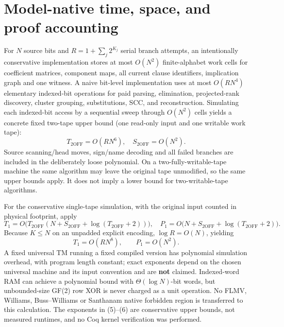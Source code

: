 \documentclass[11pt]{article}
\begin{document}
\section{Model-native time, space, and proof accounting}
For $N$ source bits and $R=1+\sum_j2^{K_j}$ serial branch attempts, an intentionally conservative implementation stores at most $O(N^2)$ finite-alphabet work cells for coefficient matrices, component maps, all current clause identifiers, implication graph and one witness. A naive bit-level implementation uses at most $O(R N^4)$ elementary indexed-bit operations for paid parsing, elimination, projected-rank discovery, cluster grouping, substitutions, SCC, and reconstruction. Simulating each indexed-bit access by a sequential sweep through $O(N^2)$ cells yields a concrete fixed two-tape upper bound (one read-only input and one writable work tape):
\[
 \boxed{T_{2\mathrm{OFF}}=O(RN^6),\quad S_{2\mathrm{OFF}}=O(N^2).} \tag{5}
\]
Source scanning/head moves, sign/name decoding and all failed branches are included in the deliberately loose polynomial. On a two-fully-writable-tape machine the same algorithm may leave the original tape unmodified, so the same upper bounds apply. It does not imply a lower bound for two-writable-tape algorithms.

For the conservative single-tape simulation, with the original input counted in physical footprint, apply
\[
 T_1=O\bigl(T_{2\mathrm{OFF}}(N+S_{2\mathrm{OFF}}+\log(T_{2\mathrm{OFF}}+2))\bigr),\quad
 P_1=O\bigl(N+S_{2\mathrm{OFF}}+\log(T_{2\mathrm{OFF}}+2)\bigr).
\]
Because $K\le N$ on an unpadded explicit encoding, $\log R=O(N)$, yielding
\[
 \boxed{T_1=O(RN^8),\qquad P_1=O(N^2).} \tag{6}
\]
A fixed universal TM running a fixed compiled version has polynomial simulation overhead, with program length constant; exact exponents depend on the chosen universal machine and its input convention and are \textbf{not} claimed. Indexed-word RAM can achieve a polynomial bound with $\Theta(\log N)$-bit words, but unbounded-size GF(2) row XOR is never charged as a unit operation. No FLMV, Williams, Buss--Williams or Santhanam native forbidden region is transferred to this calculation. The exponents in (5)--(6) are conservative upper bounds, not measured runtimes, and no Coq kernel verification was performed.
\end{document}
